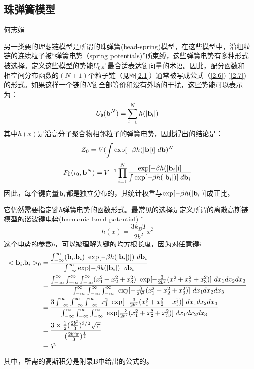 \subsection{珠弹簧模型}
{\color{red}\begin{center}
    何志娟
    \end{center}}

另一类要的理想链模型是所谓的珠弹簧(bead-spring)模型，在这些模型中，沿粗粒链的连续粒子被“弹簧电势（spring potentials)”所束缚，这些弹簧电势有多种形式被选择。定义这些模型的势能$U_{0}$是最合适表达键向量的术语。因此，配分函数和相空间分布函数的$(N+1)$个粒子链（见图\ref{2.1}）通常被写成公式（\ref{2.6})-(\ref{2.7})的形式。如果这样一个链的$N$键全部等价和没有外场的干扰，这些势能可以表示为：
\begin{equation}\label{2.26}
U_{0}(\mathbf{b}^{N})= \sum_{i=1}^{N}h(|\mathbf{b}_{i}|)
\end{equation}
其中$h(x)$是沿高分子聚合物相邻粒子的弹簧电势，因此得出的结论是：
\begin{equation}\label{2.27}
Z_{0}=V(\int \exp[-\beta h(|\mathbf{b}|)]~d\mathbf{b})^N 
\end{equation}
\begin{equation}\label{2.28}		
P_{0} (r_{0},\mathbf{b}^N) =V^{-1} \prod_{i=1}^{N} \frac{\exp[-\beta h(|\mathbf{b}_{i}|)]}{\int \exp[-\beta h(|\mathbf{b}_{i}|)]~d \mathbf{b}_{i}}
\end{equation}
因此，每个键向量$\mathbf{b}_{i}$都是独立分布的，其统计权重与$\exp[-\beta h(|\mathbf{b}_{i}|)]$成正比。 

它仍然需要指定键$h$弹簧电势的函数形式。最常见的选择是定义所谓的离散高斯链模型的谐波键电势(harmonic bond potential)： 
\begin{equation}\label{2.29}
h(x)=\frac{3k_{B}T}{2b^2} x^2  
\end{equation}
这个电势的参数$b$，可以被理解为键的均方根长度，因为对任意键$i$
\begin{equation}\label{2.30}
\begin{aligned}
<\mathbf{b}_{i}.\mathbf{b}_{i}>_{0}&= \frac{\int_{-\infty}^{\infty} (\mathbf{b}_{i}.\mathbf{b}_{i})~\exp[-\beta h(|\mathbf{b}_{i}|)])~d\mathbf{b}_{i}}{\int_{-\infty}^{\infty} \exp[-\beta h(|\mathbf{b}_{i}|)]~d\mathbf{b}_{i}}\\ &=\frac{\int_{-\infty}^{\infty}\int_{-\infty}^{\infty}\int_{-\infty}^{\infty}(x_1^2+x_2^2+x_3^2)~\exp[{-\frac{3}{2b^2}(x_1^2+x_2^2+x_3^2)}]~dx_1dx_2dx_3}{\int_{-\infty}^{\infty}\int_{-\infty}^{\infty}\int_{-\infty}^{\infty}~\exp[{-\frac{3}{2b^2}(x_1^2+x_2^2+x_3^2)}]~dx_1dx_2dx_3}\\ &=\frac{3\int_{-\infty}^{\infty}\int_{-\infty}^{\infty}\int_{-\infty}^{\infty}~x_1^2~\exp[{-\frac{3}{2b^2}(x_1^2+x_2^2+x_3^2)}]~dx_1dx_2dx_3}{\int_{-\infty}^{\infty}\int_{-\infty}^{\infty}\int_{-\infty}^{\infty}~\exp[{\frac{-3}{2b^2}(x_1^2+x_2^2+x_3^2)}]~dx_1dx_2dx_3}\\ &=\frac{3 \times\frac{1}{2} (\frac{2b^2}{3})^{3/2}\sqrt{\pi}}{(\frac{2b^2\pi}{3})^{\frac{1}{2}}}\\ &=b^2
\end{aligned}
\end{equation}
其中，所需的高斯积分是附录B中给出的公式的。

